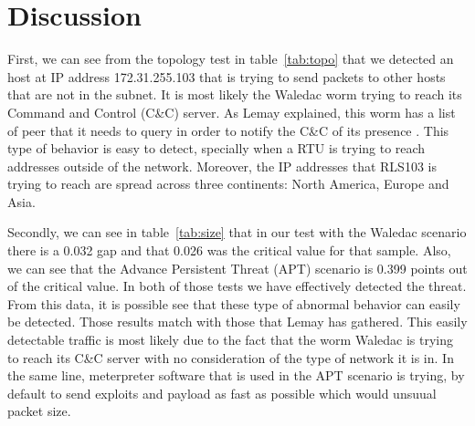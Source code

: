 \documentclass[12pt,journal,compsoc]{IEEEtran}
\begin{document}
\begin{empfile}
\begin{table}[ht!]
\begin{tabular}{|C{1.1cm} | C{2.1cm} | C{1cm} |C{0.8cm} | C{1.1cm} |}
    \end{tabular}
\end{table}

\section{Discussion}
First, we can see from the topology test in table~\ref{tab:topo} that we detected an host at IP address 172.31.255.103 that is trying to send packets to other hosts that are not in the subnet. It is most likely the Waledac worm trying to reach its Command and Control (C\&C) server. As Lemay explained, this worm has a list of peer that it needs to query in order to notify the C\&C of its presence \cite{lemay}. This type of behavior is easy to detect, specially when a RTU is trying to reach addresses outside of the network. Moreover, the IP addresses that RLS103 is trying to reach are spread across three continents: North America, Europe and Asia.

Secondly, we can see in table~\ref{tab:size} that in our test with the Waledac scenario there is a 0.032 gap and that 0.026 was the critical value for that sample. Also, we can see that the Advance Persistent Threat (APT) scenario is 0.399 points out of the critical value. In both of those tests we have effectively detected the threat. From this data, it is possible see that these type of abnormal behavior can easily be detected. Those results match with those that Lemay has gathered. This easily detectable traffic is most likely due to the fact that the worm Waledac is trying to reach its C\&C server with no consideration of the type of network it is in. In the same line, meterpreter software that is used in the APT scenario is trying, by default to send exploits and payload as fast as possible which would unsuual packet size.


\end{empfile}
\end{document}
